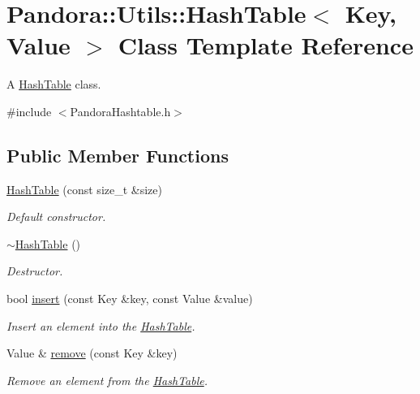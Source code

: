 \hypertarget{classPandora_1_1Utils_1_1HashTable}{
\section{Pandora::Utils::HashTable$<$ Key, Value $>$ Class Template Reference}
\label{classPandora_1_1Utils_1_1HashTable}
}


A \hyperlink{classPandora_1_1Utils_1_1HashTable}{HashTable} class.  


{\ttfamily \#include $<$PandoraHashtable.h$>$}\subsection*{Public Member Functions}
\begin{DoxyCompactItemize}
\item 
\hyperlink{classPandora_1_1Utils_1_1HashTable_a3650951a9de3e61dd2deade67636a0cf}{HashTable} (const size\_\-t \&size)
\begin{DoxyCompactList}\small\item\em Default constructor. \item\end{DoxyCompactList}\item 
\hyperlink{classPandora_1_1Utils_1_1HashTable_adfb815eb2cfe21eca1beffa61be7726d}{$\sim$HashTable} ()
\begin{DoxyCompactList}\small\item\em Destructor. \item\end{DoxyCompactList}\item 
bool \hyperlink{classPandora_1_1Utils_1_1HashTable_a57a06b0dde67656b86fd91c04e9a4fbf}{insert} (const Key \&key, const Value \&value)
\begin{DoxyCompactList}\small\item\em Insert an element into the \hyperlink{classPandora_1_1Utils_1_1HashTable}{HashTable}. \item\end{DoxyCompactList}\item 
Value \& \hyperlink{classPandora_1_1Utils_1_1HashTable_ad5c2861d3938bb8e6e4b21bbf7fde6df}{remove} (const Key \&key)
\begin{DoxyCompactList}\small\item\em Remove an element from the \hyperlink{classPandora_1_1Utils_1_1HashTable}{HashTable}. \item\end{DoxyCompactList}\item 

\end{DoxyCompactItemize}
